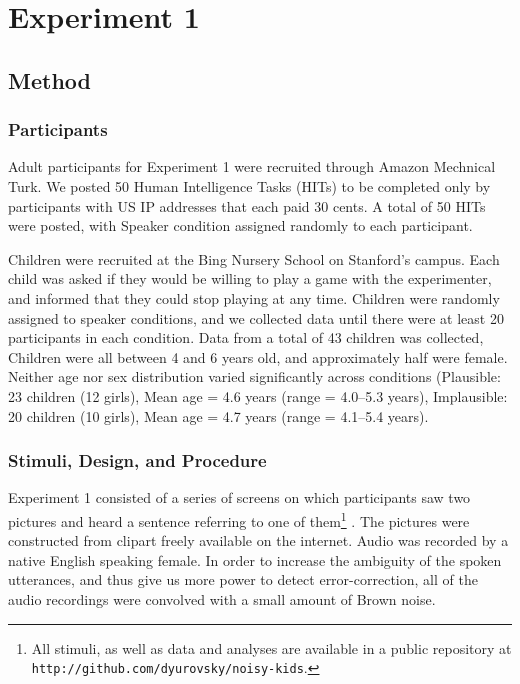 \documentclass[man,floatsintext]{apa6}
\begin{document}
\section{Experiment 1}

\subsection{Method}
\subsubsection{Participants}

Adult participants for Experiment 1 were recruited through Amazon Mechnical Turk. We posted 50 Human Intelligence Tasks (HITs) to be completed only by participants with US IP addresses that each paid 30 cents. A total of 50 HITs were posted, with Speaker condition assigned randomly to each participant.

Children were recruited at the Bing Nursery School on Stanford's campus. Each child was asked if they would be willing to play a game with the experimenter, and informed that they could stop playing at any time. Children were randomly assigned to speaker conditions, and we collected data until there were at least 20 participants in each condition. Data from a total of 43 children was collected, Children were all between 4 and 6 years old, and approximately half were female. Neither age nor sex distribution varied significantly across conditions (Plausible: 23 children (12 girls), Mean age = 4.6 years (range = 4.0--5.3 years), Implausible: 20 children (10 girls), Mean age = 4.7 years (range = 4.1--5.4 years).

\subsubsection{Stimuli, Design, and Procedure}

Experiment 1 consisted of a series of screens on which participants saw two pictures and heard a sentence referring to one of them\footnote{All stimuli, as well as data and analyses are available in a public repository at \small{\tt{http://github.com/dyurovsky/noisy-kids}}.} . The pictures were constructed from clipart freely available on the internet. Audio was recorded by a native English speaking female. In order to increase the ambiguity of the spoken utterances, and thus give us more power to detect error-correction, all of the audio recordings were convolved with a small amount of Brown noise.
\end{document}
